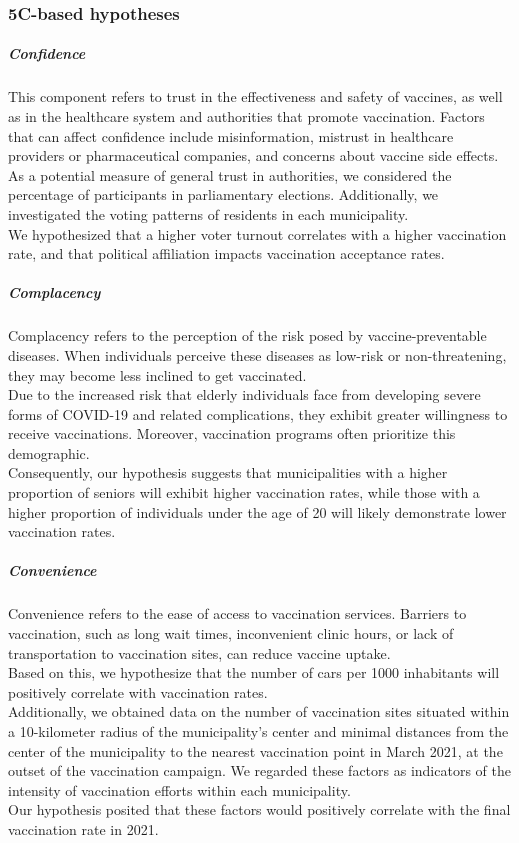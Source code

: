 \documentclass[a4paper,12pt]{article} %
\begin{document}
\subsubsection{5C-based hypotheses}
\subparagraph{Confidence}
This component refers to trust in the effectiveness and safety of vaccines, as well as in the healthcare system and authorities that promote vaccination. Factors that can affect confidence include misinformation, mistrust in healthcare providers or pharmaceutical companies, and concerns about vaccine side effects.
\\
As a potential measure of general trust in authorities, we considered the percentage of participants in parliamentary elections. Additionally, we investigated the voting patterns of residents in each municipality.
\\
We hypothesized that a higher voter turnout correlates with a higher vaccination rate, and that political affiliation impacts vaccination acceptance rates. 
\subparagraph{Complacency}
Complacency refers to the perception of the risk posed by vaccine-preventable diseases. When individuals perceive these diseases as low-risk or non-threatening, they may become less inclined to get vaccinated.
\\
Due to the increased risk that elderly individuals face from developing severe forms of COVID-19 and related complications, they exhibit greater willingness to receive vaccinations. Moreover, vaccination programs often prioritize this demographic. 
\\
Consequently, our hypothesis suggests that municipalities with a higher proportion of seniors will exhibit higher vaccination rates, while those with a higher proportion of individuals under the age of 20 will likely demonstrate lower vaccination rates.

\subparagraph{Convenience}
Convenience refers to the ease of access to vaccination services. Barriers to vaccination, such as long wait times, inconvenient clinic hours, or lack of transportation to vaccination sites, can reduce vaccine uptake. 
\\
Based on this, we hypothesize that the number of cars per 1000 inhabitants will positively correlate with vaccination rates. 
\\
Additionally, we obtained data on the number of vaccination sites situated within a 10-kilometer radius of the municipality's center and minimal distances from the center of the municipality to the nearest vaccination point in March 2021, at the outset of the vaccination campaign. We regarded these factors as indicators of the intensity of vaccination efforts within each municipality. 
\\
Our hypothesis posited that these factors would positively correlate with the final vaccination rate in 2021.
\end{document}

